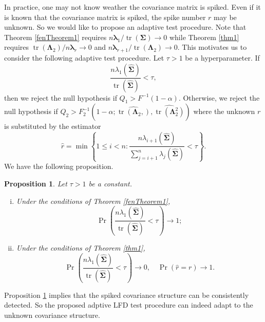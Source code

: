 \documentclass[12pt]{article} %
\DeclareMathOperator{\mytr}{tr}
\newcommand{\bfsym}[1]{\ensuremath{\boldsymbol{#1}}}
\def\blambda {\bfsym {\lambda}}
\def\bLambda {\bfsym {\Lambda}}
\def\bSigma {\bfsym {\Sigma}}
\newtheorem{proposition}{Proposition}
\theoremstyle{definition}
\begin{document}
In practice, one may not know weather the covariance matrix is spiked. Even if it is known that the covariance matrix is spiked, the spike number $r$ may be unknown.
So we would like to propose an adaptive test procedure.
Note that Theorem \ref{fenTheorem1} requires $n\blambda_1/\mytr(\bSigma)\to 0$ while Theorem \ref{thm1} requires $\mytr(\bLambda_2)/n\blambda_r\to 0$ and $n\blambda_{r+1}/\mytr(\bLambda_2)\to 0$.
This motivates us to consider the following adaptive test procedure.
Let $\tau>1$ be a hyperparameter.
If
\begin{equation*}
    \frac{
        n\lambda_1(\hat{\bSigma})
    }{
\mytr(\hat{\bSigma})}
<\tau,
\end{equation*}
then we reject the null hypothesis if $Q_1 > F^{-1}(1-\alpha)$.
Otherwise, we reject the null hypothesis if $Q_2> F_2^{-1}(1-\alpha;\widehat{\mytr(\bLambda_2,)},\widehat{\mytr(\bLambda_2^2)})$ where the unknown $r$ is substituted by the estimator
\begin{equation*}
    \hat{r}=\min
    \left\{
1\leq i< n:
    \frac{
        n\lambda_{i+1}(\hat{\bSigma})
}
{    
    \sum_{j=i+1}^n
\lambda_j(\hat{\bSigma})}
<
\tau
\right\}
.
\end{equation*}
We have the following proposition.
\begin{proposition}\label{numberConsistency}
    Let $\tau>1$ be a constant.
    \begin{enumerate}[(i)]
        \item 
    Under the conditions of Theorem \ref{fenTheorem1}, 
    \begin{equation*}
        \Pr\left(
    \frac{
        n\lambda_1(\hat{\bSigma})
    }{
    \mytr(\hat{\bSigma})}
<\tau
\right)\to 1
;
    \end{equation*}
\item
    Under the conditions of Theorem \ref{thm1},
    \begin{equation*}
        \Pr\left(
    \frac{
        n\lambda_1(\hat{\bSigma})
    }{
    \mytr(\hat{\bSigma})}
<\tau
\right)\to 0,\quad
\Pr(\hat{r}= r)\to 1
.
    \end{equation*}
    \end{enumerate}
\end{proposition}
Proposition \ref{numberConsistency} implies that the spiked covariance structure can be consistently detected.
So the proposed adptive LFD test procedure can indeed adapt to the unknown covariance structure.
\end{document}
